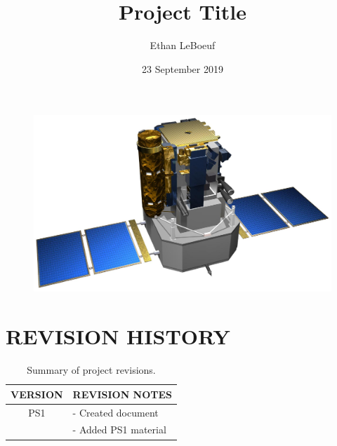 \documentclass[12pt,a4paper,notitlepage]{article}
\begin{document}
\title{\Huge \textbf{Project Title}}
\author{\Large Ethan LeBoeuf}
\date{\Large 23 September 2019}

\begin{minipage}[h]{\textwidth}
	\vspace{4 cm}
	\advance\leftskip-1in
    \maketitle
\end{minipage}

\begin{figure}[H]
\centering
\includegraphics[scale=0.28]{Images/SOHO.jpg}
\end{figure}

\pagebreak

\section*{\Large REVISION HISTORY}

\begin{table}[h!]
\begin{center}
\begin{tabular} [0.9 \textwidth]{cl}
\hline \hline
\multicolumn{1}{c}{VERSION} & \multicolumn{1}{l}{REVISION NOTES} \\
\hline
PS1 & - Created document \\
    & - Added PS1 material \\
\hline \hline
\end{tabular}
	\caption{Summary of project revisions.}
\end{center}
\end{table}
 
\end{document}
